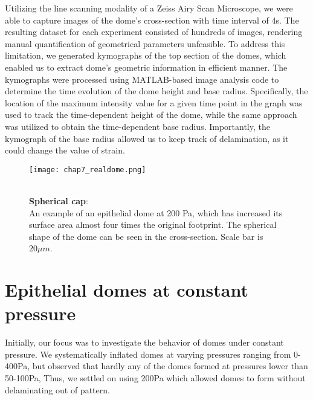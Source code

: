 Utilizing the line scanning modality of a Zeiss Airy Scan Microscope, we were able to capture images of the dome’s cross-section with time interval of 4s. The resulting dataset for each experiment consisted of hundreds of images, rendering manual quantification of geometrical parameters unfeasible. To address this limitation, we generated kymographs of the top section of the domes, which enabled us to extract dome’s geometric information in efficient manner. The kymographs were processed using MATLAB-based image analysis code to determine the time evolution of the dome height and base radius. Specifically, the location of the maximum intensity value for a given time point in the graph was used to track the time-dependent height of the dome, while the same approach was utilized to obtain the time-dependent base radius. Importantly, the kymograph of the base radius allowed us to keep track of delamination, as it could change the value of strain.

\begin{figure}
	\begin{minipage}[c]{0.7\textwidth}
		\texttt{[image: chap7\_realdome.png]}
	\end{minipage}\hfill
	\begin{minipage}[c]{0.27\textwidth}
		\caption{\\ \textbf{Spherical cap}:\\An example of an epithelial dome at 200 Pa, which has increased its surface area almost four times the original footprint. The spherical shape of the dome can be seen in the cross-section. Scale bar is  $20 \mu m$.
		} \label{fig_7_1}
	\end{minipage}
\end{figure}

\hypertarget{epithelial-domes-at-constant-pressure}{%
	\section{Epithelial domes at constant
		pressure}\label{epithelial-domes-at-constant-pressure}}

Initially, our focus was to investigate the behavior of domes under constant pressure. We systematically inflated domes at varying pressures ranging from 0-400\unit{\pascal}, but observed that hardly any of the domes formed at pressures lower than 50-100\unit{\pascal}, Thus, we settled on using 200\unit{\pascal} which allowed domes to form without delaminating out of pattern.

